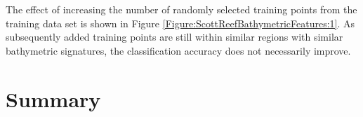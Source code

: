 			The effect of increasing the number of randomly selected training points from the training data set is shown in Figure \ref{Figure:ScottReefBathymetricFeatures:1}. As subsequently added training points are still within similar regions with similar bathymetric signatures, the classification accuracy does not necessarily improve.
												
	\section{Summary}
	
			
